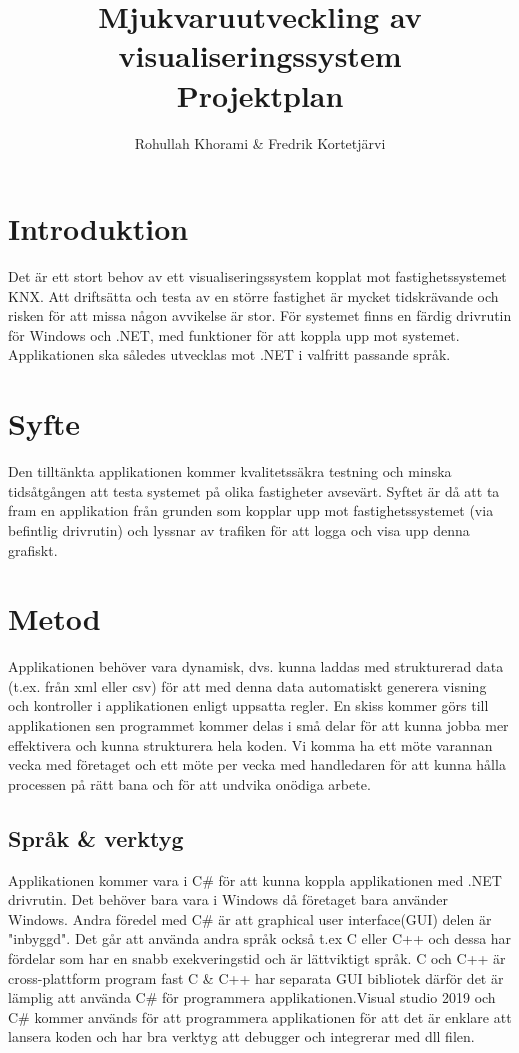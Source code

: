 \documentclass{article}
\title{Mjukvaruutveckling av visualiseringssystem\\
\Large {Projektplan}
}
\author{Rohullah Khorami \& Fredrik Kortetjärvi }
\begin{document}
\maketitle
\newpage
\tableofcontents
\newpage

\section{Introduktion}Det är ett stort behov av ett visualiseringssystem kopplat mot fastighetssystemet KNX. Att driftsätta och testa av
en större fastighet är mycket tidskrävande och risken för att missa någon avvikelse är stor. 
För systemet finns en färdig drivrutin för Windows och .NET, med funktioner för att koppla upp mot systemet.
Applikationen ska således utvecklas mot .NET i valfritt passande språk.

\section{Syfte}Den tilltänkta applikationen kommer kvalitetssäkra testning och minska tidsåtgången att testa systemet på olika fastigheter avsevärt. Syftet är då att ta fram en applikation från grunden som kopplar upp mot
fastighetssystemet (via befintlig drivrutin) och lyssnar av trafiken för att logga och visa upp denna grafiskt.

\section{Metod}
Applikationen behöver vara dynamisk, dvs. kunna laddas med strukturerad data (t.ex. från xml eller csv) för att
med denna data automatiskt generera visning och kontroller i applikationen enligt uppsatta regler. En skiss kommer görs till applikationen sen programmet kommer delas i små delar för att kunna jobba mer effektivera och kunna strukturera hela koden. Vi komma ha ett möte varannan vecka med företaget och ett möte per vecka med handledaren för att kunna hålla processen på rätt bana och för att undvika onödiga arbete. \newline
\subsection{Språk \& verktyg}
Applikationen kommer vara i C\# för att kunna koppla applikationen med .NET drivrutin. Det behöver bara vara i Windows då företaget bara använder Windows. Andra föredel med C\# är att graphical user interface(GUI) delen är "inbyggd". Det går att använda andra språk också t.ex C eller C++ och dessa har fördelar som har en snabb exekveringstid och är lättviktigt språk. C och C++ är cross-plattform program fast C \& C++ har separata GUI bibliotek därför det är lämplig att använda C\# för programmera applikationen.Visual studio 2019 och C\# kommer används för att programmera applikationen för att det är enklare att lansera koden och har bra verktyg att debugger och integrerar med dll filen.\cite{CPROG}\newline 
\end{document}
